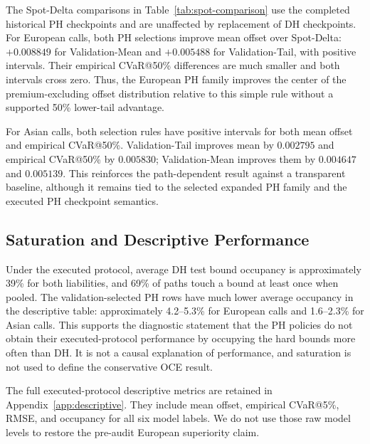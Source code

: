 \documentclass[conference]{IEEEtran}
\begin{document}
The Spot-Delta comparisons in Table~\ref{tab:spot-comparison} use the completed
historical PH checkpoints and are unaffected by replacement of DH checkpoints.
For European calls, both PH selections improve mean offset over Spot-Delta:
$+0.008849$ for Validation-Mean and $+0.005488$ for Validation-Tail, with
positive intervals. Their empirical CVaR@50\% differences are much smaller and
both intervals cross zero. Thus, the European PH family improves the center of
the premium-excluding offset distribution relative to this simple rule without
a supported 50\% lower-tail advantage.

For Asian calls, both selection rules have positive intervals for both mean
offset and empirical CVaR@50\%. Validation-Tail improves mean by $0.002795$ and
empirical CVaR@50\% by $0.005830$; Validation-Mean improves them by $0.004647$
and $0.005139$. This reinforces the path-dependent result against a transparent
baseline, although it remains tied to the selected expanded PH family and the
executed PH checkpoint semantics.

\begin{table}[t]
\centering
\footnotesize
\resizebox{0.96\textwidth}{!}{}
\caption{Paired historical comparisons with Spot-Delta. Higher mean offset and
empirical CVaR@50\% are better; positive differences favor PH. These rows use
the completed historical PH protocol and are separate from the DH checkpoint
sensitivity.}
\label{tab:spot-comparison}
\end{table}

\subsection{Saturation and Descriptive Performance}

Under the executed protocol, average DH test bound occupancy is approximately
39\% for both liabilities, and 69\% of paths touch a bound at least once when
pooled. The validation-selected PH rows have much lower average occupancy in
the descriptive table: approximately 4.2--5.3\% for European calls and
1.6--2.3\% for Asian calls. This supports the diagnostic statement that the PH
policies do not obtain their executed-protocol performance by occupying the
hard bounds more often than DH. It is not a causal explanation of performance,
and saturation is not used to define the conservative OCE result.

The full executed-protocol descriptive metrics are retained in
Appendix~\ref{app:descriptive}. They include mean offset, empirical CVaR@5\%,
RMSE, and occupancy for all six model labels. We do not use those raw model
levels to restore the pre-audit European superiority claim.
\end{document}
